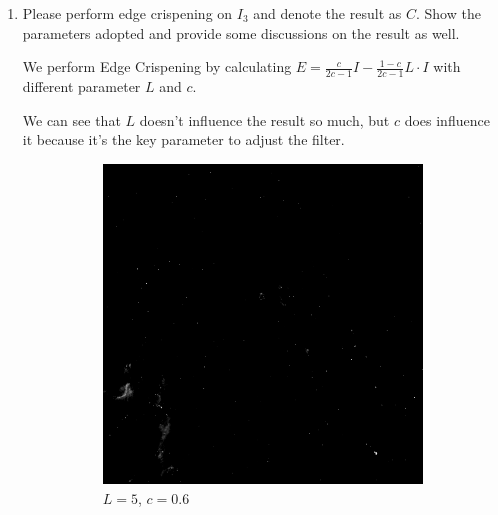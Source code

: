 \documentclass{article}
\begin{document}
\begin{enumerate}[label=(\alph*)]
    \item Please perform edge crispening on $I_3$ and denote the result as $C$. Show the parameters adopted and provide some discussions on the result as well.

    We perform Edge Crispening by calculating $E = \frac{c}{2c - 1} I - \frac{1 - c} {2c - 1} L \cdot I$ with different parameter $L$ and $c$.

    We can see that $L$ doesn't influence the result so much, but $c$ does influence it because it's the key parameter to adjust the filter.

    \begin{figure}[!htb]
        \centering
        \begin{subfigure}[b]{0.3\textwidth}
            \includegraphics[width=\textwidth]{img/C_5_06.png}
            \caption{$L = 5$, $c = 0.6$}
        \end{subfigure}
        ~
        \begin{subfigure}[b]{0.3\textwidth}

\end{subfigure}
\end{figure}
\end{enumerate}
\end{document}
